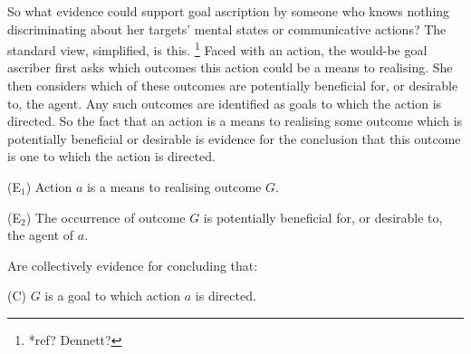 \documentclass[12pt,a4paper]{extarticle}
\begin{document}
So what evidence could support goal ascription by someone who knows nothing discriminating about her targets' mental states or communicative actions?
The standard view, simplified, is this.%
\footnote{
*ref? Dennett?
}
Faced with an action,
the would-be goal ascriber first asks which outcomes this action could be a means to realising.
She then considers which of these outcomes are potentially beneficial for, or desirable to, the agent.
Any such outcomes are identified as goals to which the action is directed.
So the fact that an action is a means to realising some outcome which is potentially beneficial or desirable is evidence for the conclusion that this outcome is one to which the action is directed.
%
\begin{idescription}
\item[(E$_1$)] Action $a$ is a means to realising outcome $G$.
\item[(E$_2$)] The occurrence of outcome $G$ is potentially beneficial for, or desirable to, the agent of $a$.
\end{idescription}
%
Are collectively evidence for concluding that:
%
\begin{idescription}
\item[(C)] $G$ is a goal to which action $a$ is directed.
\end{idescription}
%





\end{document}
